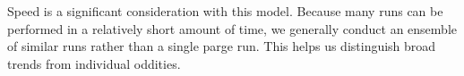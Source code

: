 \documentclass{article}
\begin{document}
Speed is a significant consideration with this model. Because many runs can be performed in a relatively short amount of time, we generally conduct an ensemble of similar runs rather than a single parge run. This helps us distinguish broad trends from individual oddities. 










\end{document}
